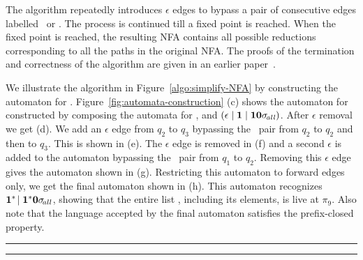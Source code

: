 \documentclass[9pt]{sigplanconf}
\newcommand{\comment}[1]{{\color{Myblue}{(#1)}}}
\begin{document}
\begin{enumerate}
\begin{figure*}[t]
\begin{boxedminipage}{\textwidth}
\begin{center}
   
\end{center}
\end{boxedminipage}
 \caption{Algorithm for transforming an NFA to  accept forward
   paths only.}\label{algo:simplify-NFA} \figrule
\end{figure*}

The algorithm repeatedly introduces  $\epsilon$ edges to bypass a
pair of consecutive edges labelled \bcar\acar\ or \bcdr\acdr.  The
process is  continued till  a fixed point  is reached.   When the
fixed point  is reached, the resulting NFA  contains all possible
reductions corresponding  to all the  paths in the  original NFA.
The proofs  of the termination  and correctness of  the algorithm
are given in an earlier paper~\cite{karkare07liveness}.

\comment{change according to example}
We  illustrate  the  algorithm  in  Figure~\ref{algo:simplify-NFA}  by
constructing      the       automaton      for      .
Figure~\ref{fig:automata-construction}  (c)  shows  the automaton  for
   constructed   by   composing  the   automata   for
,  and $(\epsilon \mid \mathbf{1}
\mid \mathbf{1}\mathbf{0}\sigma_{\mathit{\!all}})$.  After $\epsilon$ removal we
get (d). We  add an $\epsilon$ edge from $q_2$  to $q_3$ bypassing the
\bcdr\acdr\ pair from $q_2$ to $q_2$  and then to $q_3$. This is shown
in (e).  The $\epsilon$ edge is removed in (f) and a second $\epsilon$
is added to the automaton bypassing the \bcar\acar\ pair from $q_1$ to
$q_2$.   Removing this $\epsilon$  edge gives  the automaton  shown in
(g).  Restricting  this automaton  to forward edges  only, we  get the
final   automaton   shown    in   (h).   This   automaton   recognizes
$\mathbf{1}^{*}\!\mid\mathbf{1}^{*}\mathbf{0}  \sigma_{\mathit \!all}$,  showing that
the entire list \py, including  its elements, is live at $\pi_9$. Also
note that the  language accepted by the final  automaton satisfies the
prefix-closed property.


\hrule
\hrule




\end{enumerate}
\end{document}
